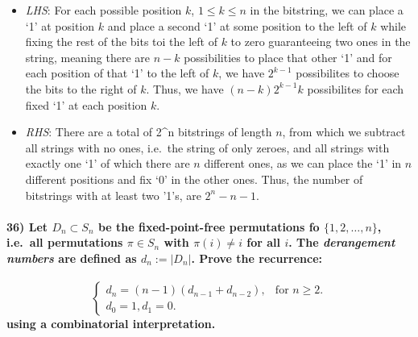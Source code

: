 \documentclass[
]{article}
\begin{document}
\begin{itemize}
\item
  \emph{LHS}: For each possible position \(k\), \(1 \leq k \leq n\) in
  the bitstring, we can place a `1' at position \(k\) and place a second
  `1' at some position to the left of \(k\) while fixing the rest of the
  bits toi the left of \(k\) to zero guaranteeing two ones in the
  string, meaning there are \(n-k\) possibilities to place that other
  `1' and for each position of that `1' to the left of \(k\), we have
  \(2^{k-1}\) possibilites to choose the bits to the right of \(k\).
  Thus, we have \((n-k)2^{k-1}k\) possibilites for each fixed `1' at
  each position \(k\).
\item
  \emph{RHS}: There are a total of 2\^{}n bitstrings of length \(n\),
  from which we subtract all strings with no ones, i.e.~the string of
  only zeroes, and all strings with exactly one `1' of which there are
  \(n\) different ones, as we can place the `1' in \(n\) different
  positions and fix `0' in the other ones. Thus, the number of
  bitstrings with at least two '1's, are \(2^n - n -1\).
\end{itemize}

\hypertarget{let-d_n-subset-s_n-be-the-fixed-point-free-permutations-fo-12-dots-n-i.e.-all-permutations-pi-in-s_n-with-pii-neq-i-for-all-i.-the-derangement-numbers-are-defined-as-d_n-d_n.-prove-the-recurrence}{%
\paragraph{\texorpdfstring{36) Let \(D_n \subset S_n\) be the
fixed-point-free permutations fo \(\{1,2, \dots, n\}\), i.e.~all
permutations \(\pi \in S_n\) with \(\pi(i) \neq i\) for all \(i\). The
\emph{derangement numbers} are defined as \(d_n := |D_n|\). Prove the
recurrence:}{36) Let D\_n \textbackslash subset S\_n be the fixed-point-free permutations fo \textbackslash\{1,2, \textbackslash dots, n\textbackslash\}, i.e.~all permutations \textbackslash pi \textbackslash in S\_n with \textbackslash pi(i) \textbackslash neq i for all i. The derangement numbers are defined as d\_n := \textbar D\_n\textbar. Prove the recurrence:}}\label{let-d_n-subset-s_n-be-the-fixed-point-free-permutations-fo-12-dots-n-i.e.-all-permutations-pi-in-s_n-with-pii-neq-i-for-all-i.-the-derangement-numbers-are-defined-as-d_n-d_n.-prove-the-recurrence}}

\[
    \begin{cases}
        d_n = (n-1)(d_{n-1} + d_{n-2}), & \text{for $n \geq 2$}.\\
        d_0 = 1, d_1 = 0.
    \end{cases}
\] \textbf{using a combinatorial interpretation.}
\end{document}

